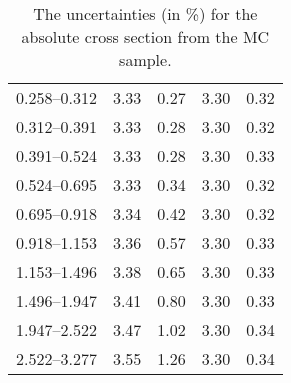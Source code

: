 \begin{table}
\begin{center}
\begin{tabular}{@{}l l l l l@{}}
            0.258--0.312 & 3.33 & 0.27 & 3.30 & 0.32  \\
            0.312--0.391 & 3.33 & 0.28 & 3.30 & 0.32  \\
            0.391--0.524 & 3.33 & 0.28 & 3.30 & 0.33  \\
            0.524--0.695 & 3.33 & 0.34 & 3.30 & 0.32  \\
            0.695--0.918 & 3.34 & 0.42 & 3.30 & 0.32  \\
            0.918--1.153 & 3.36 & 0.57 & 3.30 & 0.33  \\
            1.153--1.496 & 3.38 & 0.65 & 3.30 & 0.33  \\
            1.496--1.947 & 3.41 & 0.80 & 3.30 & 0.33  \\
            1.947--2.522 & 3.47 & 1.02 & 3.30 & 0.34  \\
            2.522--3.277 & 3.55 & 1.26 & 3.30 & 0.34  \\
            \bottomrule
        \end{tabular}
    \end{center}
    \caption[
        The uncertainties for the absolute cross section from the \MADGRAPH MC
        sample.
    ]{
        The uncertainties (in \%) for the absolute cross section from the
        \MADGRAPH MC sample.
    }
    \label{tab:madgraph_uncert_abs}
\end{table}
